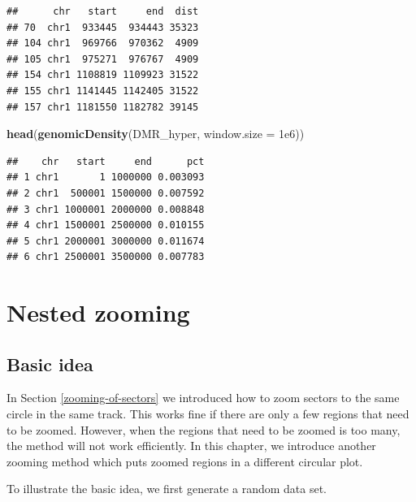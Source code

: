 \documentclass[]{book}
\newenvironment{Shaded}{\begin{snugshade}}{\end{snugshade}}
\newcommand{\KeywordTok}[1]{\textcolor[rgb]{0.13,0.29,0.53}{\textbf{#1}}}
\newcommand{\DataTypeTok}[1]{\textcolor[rgb]{0.13,0.29,0.53}{#1}}
\newcommand{\FloatTok}[1]{\textcolor[rgb]{0.00,0.00,0.81}{#1}}
\newcommand{\NormalTok}[1]{#1}
\begin{document}
\begin{verbatim}
##      chr   start     end  dist
## 70  chr1  933445  934443 35323
## 104 chr1  969766  970362  4909
## 105 chr1  975271  976767  4909
## 154 chr1 1108819 1109923 31522
## 155 chr1 1141445 1142405 31522
## 157 chr1 1181550 1182782 39145
\end{verbatim}

\begin{Shaded}
\begin{Highlighting}[]
\KeywordTok{head}\NormalTok{(}\KeywordTok{genomicDensity}\NormalTok{(DMR_hyper, }\DataTypeTok{window.size =} \FloatTok{1e6}\NormalTok{))}
\end{Highlighting}
\end{Shaded}

\begin{verbatim}
##    chr   start     end      pct
## 1 chr1       1 1000000 0.003093
## 2 chr1  500001 1500000 0.007592
## 3 chr1 1000001 2000000 0.008848
## 4 chr1 1500001 2500000 0.010155
## 5 chr1 2000001 3000000 0.011674
## 6 chr1 2500001 3500000 0.007783
\end{verbatim}

\chapter{Nested zooming}\label{nested-zooming}

\section{Basic idea}\label{basic-idea}

In Section \ref{zooming-of-sectors} we introduced how to zoom sectors to
the same circle in the same track. This works fine if there are only a
few regions that need to be zoomed. However, when the regions that need
to be zoomed is too many, the method will not work efficiently. In this
chapter, we introduce another zooming method which puts zoomed regions
in a different circular plot.

To illustrate the basic idea, we first generate a random data set.
\end{document}

